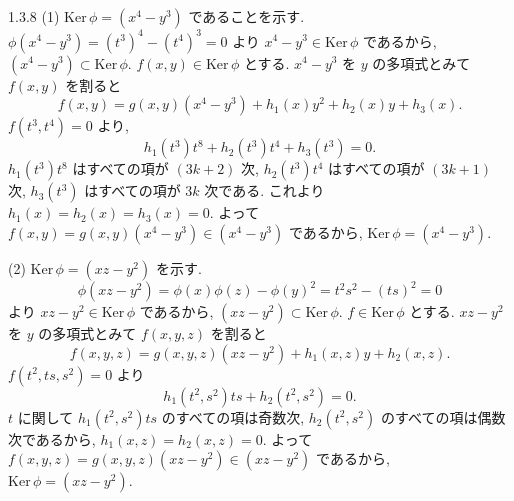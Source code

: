 \begin{ans}{1.3.8}
  (1) $\mathrm{Ker}\,\phi = (x^4 - y^3)$ であることを示す.
  $\phi(x^4 - y^3) = (t^3)^4 - (t^4)^3 = 0$ より $x^4 - y^3 \in \mathrm{Ker}\,\phi$ であるから,
  $(x^4 - y^3) \subset \mathrm{Ker}\,\phi$.
  $f(x,y) \in \mathrm{Ker}\,\phi$ とする.
  $x^4 - y^3$ を $y$ の多項式とみて $f(x,y)$ を割ると
  \[
    f(x,y) = g(x,y)(x^4 - y^3) + h_1(x)y^2 + h_2(x)y + h_3(x).
  \]
  $f(t^3, t^4) = 0$ より,
  \[
    h_1(t^3)t^8 + h_2(t^3)t^4 + h_3(t^3) = 0.
  \]
  $h_1(t^3)t^8$ はすべての項が $(3k+2)$ 次, $h_2(t^3)t^4$ はすべての項が $(3k+1)$ 次,
  $h_3(t^3)$ はすべての項が $3k$ 次である.
  これより $h_1(x) = h_2(x) = h_3(x) = 0$.
  よって $f(x,y) = g(x,y)(x^4 - y^3) \in (x^4 - y^3)$ であるから, $\mathrm{Ker}\,\phi = (x^4 - y^3)$.

  \medskip
  (2) $\mathrm{Ker}\,\phi = (xz - y^2)$ を示す.
  \[
    \phi(xz - y^2) = \phi(x)\phi(z) - \phi(y)^2 = t^2 s^2 - (ts)^2 = 0
  \]
  より $xz - y^2 \in \mathrm{Ker}\,\phi$ であるから, $(xz - y^2) \subset \mathrm{Ker}\,\phi$.
  $f \in \mathrm{Ker}\,\phi$ とする.
  $xz - y^2$ を $y$ の多項式とみて $f(x,y,z)$ を割ると
  \[
    f(x,y,z) = g(x,y,z)(xz - y^2) + h_1(x,z)y + h_2(x,z).
  \]
  $f(t^2, ts, s^2) = 0$ より
  \[
    h_1(t^2, s^2)ts + h_2(t^2, s^2) = 0.
  \]
  $t$ に関して $h_1(t^2, s^2)ts$ のすべての項は奇数次, $h_2(t^2, s^2)$ のすべての項は偶数次であるから,
  $h_1(x,z) = h_2(x,z) = 0$.
  よって $f(x,y,z) = g(x,y,z)(xz - y^2) \in (xz - y^2)$ であるから, $\mathrm{Ker}\,\phi = (xz - y^2)$.


\end{ans}
